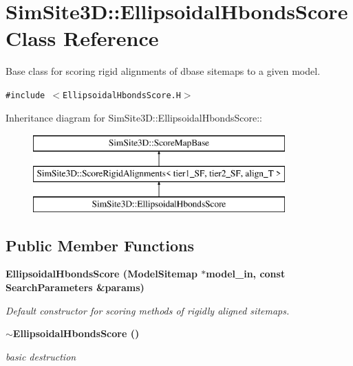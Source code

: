 \section{SimSite3D::Ellipsoidal\-Hbonds\-Score Class Reference}
\label{classSimSite3D_1_1EllipsoidalHbondsScore}
Base class for scoring rigid alignments of dbase sitemaps to a given model.  


{\tt \#include $<$Ellipsoidal\-Hbonds\-Score.H$>$}

Inheritance diagram for SimSite3D::Ellipsoidal\-Hbonds\-Score::\begin{figure}[H]
\begin{center}
\leavevmode
\includegraphics[height=3cm]{classSimSite3D_1_1EllipsoidalHbondsScore}
\end{center}
\end{figure}
\subsection*{Public Member Functions}
\begin{CompactItemize}
\item 
\bf{Ellipsoidal\-Hbonds\-Score} (\bf{Model\-Sitemap} $\ast$model\_\-in, const \bf{Search\-Parameters} \&params)
\begin{CompactList}\small\item\em Default constructor for scoring methods of rigidly aligned sitemaps. \item\end{CompactList}\item 
\bf{$\sim$Ellipsoidal\-Hbonds\-Score} ()\label{classSimSite3D_1_1EllipsoidalHbondsScore_4b6b13709f9e3ad4e9402ec26cbef0cd}

\begin{CompactList}\small\item\em basic destruction \item\end{CompactList}\end{CompactItemize}
